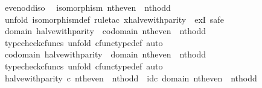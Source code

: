 \begin{isabellebody}
\endisatagproof
{\isafoldproof}%
%
\isadelimproof
\isanewline
%
\endisadelimproof
\isanewline
{}\isamarkupfalse%
\ even{\isacharunderscore}{\kern0pt}odd{\isacharunderscore}{\kern0pt}iso{\isacharcolon}{\kern0pt}\isanewline
\ \ {\isachardoublequoteopen}isomorphism\ {\isacharparenleft}{\kern0pt}nth{\isacharunderscore}{\kern0pt}even\ {\isasymamalg}\ nth{\isacharunderscore}{\kern0pt}odd{\isacharparenright}{\kern0pt}{\isachardoublequoteclose}\isanewline
%
\isadelimproof
%
\endisadelimproof
%
\isatagproof
{}\isamarkupfalse%
\ {\isacharparenleft}{\kern0pt}unfold\ isomorphism{\isacharunderscore}{\kern0pt}def{\isacharcomma}{\kern0pt}\ rule{\isacharunderscore}{\kern0pt}tac\ x{\isacharequal}{\kern0pt}halve{\isacharunderscore}{\kern0pt}with{\isacharunderscore}{\kern0pt}parity\ \ exI{\isacharcomma}{\kern0pt}\ safe{\isacharparenright}{\kern0pt}\isanewline
\ \ \isamarkupfalse%
\ {\isachardoublequoteopen}domain\ halve{\isacharunderscore}{\kern0pt}with{\isacharunderscore}{\kern0pt}parity\ {\isacharequal}{\kern0pt}\ codomain\ {\isacharparenleft}{\kern0pt}nth{\isacharunderscore}{\kern0pt}even\ {\isasymamalg}\ nth{\isacharunderscore}{\kern0pt}odd{\isacharparenright}{\kern0pt}{\isachardoublequoteclose}\isanewline
\ \ \ \ \isamarkupfalse%
\ {\isacharparenleft}{\kern0pt}typecheck{\isacharunderscore}{\kern0pt}cfuncs{\isacharcomma}{\kern0pt}\ unfold\ cfunc{\isacharunderscore}{\kern0pt}type{\isacharunderscore}{\kern0pt}def{\isacharcomma}{\kern0pt}\ auto{\isacharparenright}{\kern0pt}\isanewline
\ \ \isamarkupfalse%
\ {\isachardoublequoteopen}codomain\ halve{\isacharunderscore}{\kern0pt}with{\isacharunderscore}{\kern0pt}parity\ {\isacharequal}{\kern0pt}\ domain\ {\isacharparenleft}{\kern0pt}nth{\isacharunderscore}{\kern0pt}even\ {\isasymamalg}\ nth{\isacharunderscore}{\kern0pt}odd{\isacharparenright}{\kern0pt}{\isachardoublequoteclose}\isanewline
\ \ \ \ \isamarkupfalse%
\ {\isacharparenleft}{\kern0pt}typecheck{\isacharunderscore}{\kern0pt}cfuncs{\isacharcomma}{\kern0pt}\ unfold\ cfunc{\isacharunderscore}{\kern0pt}type{\isacharunderscore}{\kern0pt}def{\isacharcomma}{\kern0pt}\ auto{\isacharparenright}{\kern0pt}\isanewline
\ \ \isamarkupfalse%
\ {\isachardoublequoteopen}halve{\isacharunderscore}{\kern0pt}with{\isacharunderscore}{\kern0pt}parity\ {\isasymcirc}\isactrlsub c\ nth{\isacharunderscore}{\kern0pt}even\ {\isasymamalg}\ nth{\isacharunderscore}{\kern0pt}odd\ {\isacharequal}{\kern0pt}\ id\isactrlsub c\ {\isacharparenleft}{\kern0pt}domain\ {\isacharparenleft}{\kern0pt}nth{\isacharunderscore}{\kern0pt}even\ {\isasymamalg}\ nth{\isacharunderscore}{\kern0pt}odd{\isacharparenright}{\kern0pt}{\isacharparenright}{\kern0pt}{\isachardoublequoteclose}\isanewline

\end{isabellebody}
